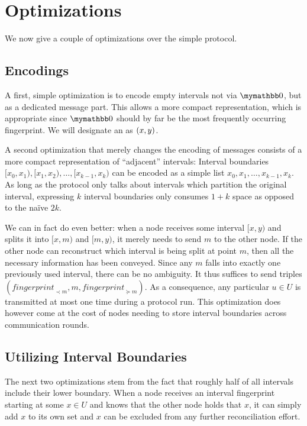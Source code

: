 \section{Optimizations}
\label{set-reconciliation-simple-optimizations}

We now give a couple of optimizations over the simple protocol.

\subsection{Encodings}

A first, simple optimization is to encode empty intervals not via $\neutraladd$, but as a dedicated message part. This allows a more compact representation, which is appropriate since $\neutraladd$ should by far be the most frequently occurring fingerprint. We will designate an  as $({x}, {y})$.

A second optimization that merely changes the encoding of messages consists of a more compact representation of ``adjacent'' intervals: Interval boundaries $[x_0, x_1), [x_1, x_2), \ldots, [x_{k - 1}, x_k)$ can be encoded as a simple list $x_0, x_1, \ldots, x_{k - 1}, x_k$. As long as the protocol only talks about intervals which partition the original interval, expressing $k$ interval boundaries only consumes $1 + k$ space as opposed to the naïve $2k$.

We can in fact do even better: when a node receives some interval $[x, y)$ and splits it into $[x, m)$ and $[m, y)$, it merely needs to send $m$ to the other node. If the other node can reconstruct which interval is being split at point $m$, then all the necessary information has been conveyed. Since any $m$ falls into exactly one previously used interval, there can be no ambiguity. It thus suffices to send triples $( \mathit{fingerprint}_{\prec m}, m, \mathit{fingerprint}_{\succeq m})$. As a consequence, any particular $u \in U$ is transmitted at most one time during a protocol run. This optimization does however come at the cost of nodes needing to store interval boundaries across communication rounds.

\subsection{Utilizing Interval Boundaries}
\label{utilizing-boundaries}

The next two optimizations stem from the fact that roughly half of all intervals include their lower boundary. When a node receives an interval fingerprint starting at some $x \in U$ and knows that the other node holds that $x$, it can simply add $x$ to its own set and $x$ can be excluded from any further reconciliation effort.

